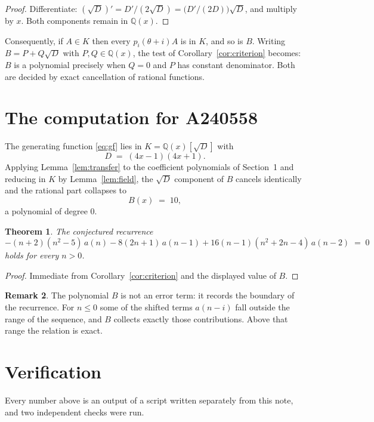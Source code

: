 \documentclass[11pt,a4paper]{article}
\theoremstyle{plain}
\newtheorem{theorem}{Theorem}
\theoremstyle{definition}
\newtheorem{remark}[theorem]{Remark}
\begin{document}
\begin{proof}
Differentiate: $(\sqrt{D})'=D'/(2\sqrt{D})=\bigl(D'/(2D)\bigr)\sqrt{D}$, and multiply by
$x$. Both components remain in $\mathbb{Q}(x)$.
\end{proof}

Consequently, if $A\in K$ then every $p_{i}(\theta+i)A$ is in $K$, and so is $B$. Writing
$B=P+Q\sqrt{D}$ with $P,Q\in\mathbb{Q}(x)$, the test of Corollary~\ref{cor:criterion}
becomes: $B$ is a polynomial precisely when $Q=0$ and $P$ has constant denominator. Both
are decided by exact cancellation of rational functions.

\section{The computation for A240558}

The generating function \eqref{eq:gf} lies in $K=\mathbb{Q}(x)[\sqrt{D}]$ with
\[
D \;=\; \left(4 x - 1\right) \left(4 x + 1\right) .
\]
Applying Lemma~\ref{lem:transfer} to the coefficient polynomials of Section~1 and reducing
in $K$ by Lemma~\ref{lem:field}, the $\sqrt{D}$ component of $B$ cancels identically and
the rational part collapses to
\[
B(x)\;=\;10 ,
\]
a polynomial of degree $0$.

\begin{theorem}
The conjectured recurrence
\[
- \left(n + 2\right) \left(n^{2} - 5\right)\,a(n) -  8 \left(2 n + 1\right)\,a(n-1) + 16 \left(n - 1\right) \left(n^{2} + 2 n - 4\right)\,a(n-2) \;=\;0
\]
holds for every $n>0$.
\end{theorem}

\begin{proof}
Immediate from Corollary~\ref{cor:criterion} and the displayed value of $B$.
\end{proof}

\begin{remark}
The polynomial $B$ is not an error term: it records the boundary of the recurrence. For
$n\le0$ some of the shifted terms $a(n-i)$ fall outside the range of the sequence,
and $B$ collects exactly those contributions. Above that range the relation is exact.
\end{remark}

\section{Verification}

Every number above is an output of a script written separately from this note, and two
independent checks were run.
\end{document}
